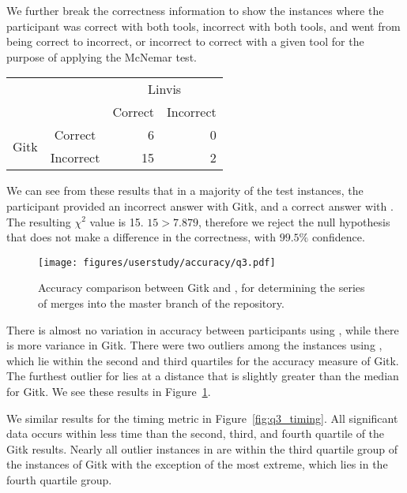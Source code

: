 We further break the correctness information to show the instances where
the participant was correct with both tools, incorrect with both tools,
and went from being correct to incorrect, or incorrect to correct with a
given tool for the purpose of applying the McNemar test.

\begin{center}
  \begin{tabular}{cc|rr}
                           &           & \multicolumn{2}{c}{Linvis}\\
                           &           & Correct                      & Incorrect\\\hline
    \multirow{2}{*}{Gitk}  & Correct   & 6                            & 0\\
                           & Incorrect & 15                           & 2\\
  \end{tabular}
\end{center}

We can see from these results that in a majority of the test instances,
the participant provided an incorrect answer with Gitk, and a correct
answer with \tool. The resulting $\chi^2$ value is 15. $15 > 7.879$,
therefore we reject the null hypothesis that \tool does not make a
difference in the correctness, with $99.5\%$ confidence.

\begin{figure}[htpb]
  \centering
  \texttt{[image: figures/userstudy/accuracy/q3.pdf]}
  \caption{Accuracy comparison between Gitk and \tool, for determining
    the series of merges into the master branch of the repository.}
  \label{fig:q3_accuracy}
\end{figure}

There is almost no variation in accuracy between participants using
\tool, while there is more variance in Gitk. There were two outliers
among the instances using \tool, which lie within the second and third
quartiles for the accuracy measure of Gitk. The furthest outlier for
\tool lies at a distance that is slightly greater than the median for
Gitk. We see these results in Figure~\ref{fig:q3_accuracy}.

We similar results for the timing metric in Figure~\ref{fig:q3_timing}.
All significant data occurs within less time than the second, third, and
fourth quartile of the Gitk results. Nearly all outlier instances in
\tool are within the third quartile group of the instances of Gitk with
the exception of the most extreme, which lies in the fourth quartile
group.

